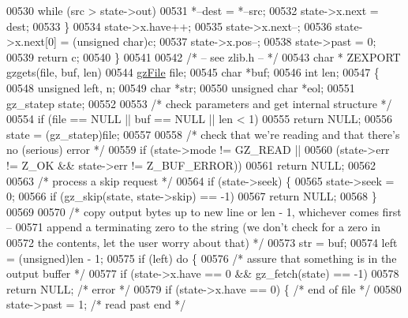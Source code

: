 \begin{DoxyCode}
00530         \textcolor{keywordflow}{while} (src > state->out)
00531             *--dest = *--src;
00532         state->x.next = dest;
00533     \}
00534     state->x.have++;
00535     state->x.next--;
00536     state->x.next[0] = (\textcolor{keywordtype}{unsigned} char)c;
00537     state->x.pos--;
00538     state->past = 0;
00539     \textcolor{keywordflow}{return} c;
00540 \}
00541 
00542 \textcolor{comment}{/* -- see zlib.h -- */}
00543 \textcolor{keywordtype}{char} * ZEXPORT gzgets(file, buf, len)
00544     \hyperlink{structgz_file__s}{gzFile} file;
00545     \textcolor{keywordtype}{char} *buf;
00546     \textcolor{keywordtype}{int} len;
00547 \{
00548     \textcolor{keywordtype}{unsigned} left, n;
00549     \textcolor{keywordtype}{char} *str;
00550     \textcolor{keywordtype}{unsigned} \textcolor{keywordtype}{char} *eol;
00551     gz\_statep state;
00552 
00553     \textcolor{comment}{/* check parameters and get internal structure */}
00554     \textcolor{keywordflow}{if} (file == NULL || buf == NULL || len < 1)
00555         \textcolor{keywordflow}{return} NULL;
00556     state = (gz\_statep)file;
00557 
00558     \textcolor{comment}{/* check that we're reading and that there's no (serious) error */}
00559     \textcolor{keywordflow}{if} (state->mode != GZ\_READ ||
00560         (state->err != Z\_OK && state->err != Z\_BUF\_ERROR))
00561         \textcolor{keywordflow}{return} NULL;
00562 
00563     \textcolor{comment}{/* process a skip request */}
00564     \textcolor{keywordflow}{if} (state->seek) \{
00565         state->seek = 0;
00566         \textcolor{keywordflow}{if} (gz\_skip(state, state->skip) == -1)
00567             \textcolor{keywordflow}{return} NULL;
00568     \}
00569 
00570     \textcolor{comment}{/* copy output bytes up to new line or len - 1, whichever comes first --}
00571 \textcolor{comment}{       append a terminating zero to the string (we don't check for a zero in}
00572 \textcolor{comment}{       the contents, let the user worry about that) */}
00573     str = buf;
00574     left = (unsigned)len - 1;
00575     \textcolor{keywordflow}{if} (left) \textcolor{keywordflow}{do} \{
00576         \textcolor{comment}{/* assure that something is in the output buffer */}
00577         \textcolor{keywordflow}{if} (state->x.have == 0 && gz\_fetch(state) == -1)
00578             \textcolor{keywordflow}{return} NULL;                \textcolor{comment}{/* error */}
00579         \textcolor{keywordflow}{if} (state->x.have == 0) \{       \textcolor{comment}{/* end of file */}
00580             state->past = 1;            \textcolor{comment}{/* read past end */}

\end{DoxyCode}
